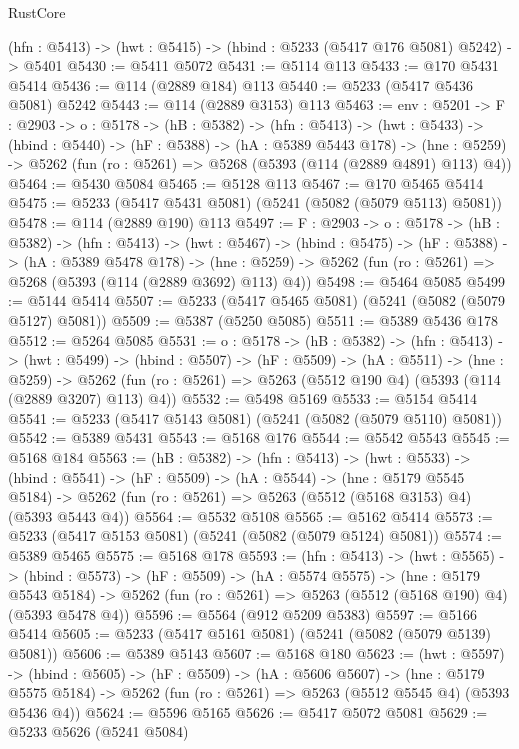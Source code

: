 \begin{lexlean}{RustCore}
\begin{coremodule}
  (hfn : @5413) -> (hwt : @5415) -> (hbind : @5233 (@5417 @176 @5081) @5242) -> @5401
@5430 := @5411 @5072
@5431 := @5114 @113
@5433 := @170 @5431 @5414
@5436 := @114 (@2889 @184) @113
@5440 := @5233 (@5417 @5436 @5081) @5242
@5443 := @114 (@2889 @3153) @113
@5463 := {env : @5201} ->
  {F : @2903} ->
  {o : @5178} ->
  (hB : @5382) ->
  (hfn : @5413) ->
  (hwt : @5433) ->
  (hbind : @5440) ->
  (hF : @5388) ->
  (hA : @5389 @5443 @178) ->
  (hne : @5259) -> @5262 (fun (ro : @5261) => @5268 (@5393 (@114 (@2889 @4891) @113) @4))
@5464 := @5430 @5084
@5465 := @5128 @113
@5467 := @170 @5465 @5414
@5475 := @5233 (@5417 @5431 @5081) (@5241 (@5082 (@5079 @5113) @5081))
@5478 := @114 (@2889 @190) @113
@5497 := {F : @2903} ->
  {o : @5178} ->
  (hB : @5382) ->
  (hfn : @5413) ->
  (hwt : @5467) ->
  (hbind : @5475) ->
  (hF : @5388) ->
  (hA : @5389 @5478 @178) ->
  (hne : @5259) -> @5262 (fun (ro : @5261) => @5268 (@5393 (@114 (@2889 @3692) @113) @4))
@5498 := @5464 @5085
@5499 := @5144 @5414
@5507 := @5233 (@5417 @5465 @5081) (@5241 (@5082 (@5079 @5127) @5081))
@5509 := @5387 (@5250 @5085)
@5511 := @5389 @5436 @178
@5512 := @5264 @5085
@5531 := {o : @5178} ->
  (hB : @5382) ->
  (hfn : @5413) ->
  (hwt : @5499) ->
  (hbind : @5507) ->
  (hF : @5509) ->
  (hA : @5511) ->
  (hne : @5259) ->
  @5262 (fun (ro : @5261) => @5263 (@5512 @190 @4) (@5393 (@114 (@2889 @3207) @113) @4))
@5532 := @5498 @5169
@5533 := @5154 @5414
@5541 := @5233 (@5417 @5143 @5081) (@5241 (@5082 (@5079 @5110) @5081))
@5542 := @5389 @5431
@5543 := @5168 @176
@5544 := @5542 @5543
@5545 := @5168 @184
@5563 := (hB : @5382) ->
  (hfn : @5413) ->
  (hwt : @5533) ->
  (hbind : @5541) ->
  (hF : @5509) ->
  (hA : @5544) ->
  (hne : @5179 @5545 @5184) ->
  @5262 (fun (ro : @5261) => @5263 (@5512 (@5168 @3153) @4) (@5393 @5443 @4))
@5564 := @5532 @5108
@5565 := @5162 @5414
@5573 := @5233 (@5417 @5153 @5081) (@5241 (@5082 (@5079 @5124) @5081))
@5574 := @5389 @5465
@5575 := @5168 @178
@5593 := (hfn : @5413) ->
  (hwt : @5565) ->
  (hbind : @5573) ->
  (hF : @5509) ->
  (hA : @5574 @5575) ->
  (hne : @5179 @5543 @5184) ->
  @5262 (fun (ro : @5261) => @5263 (@5512 (@5168 @190) @4) (@5393 @5478 @4))
@5596 := @5564 (@912 @5209 @5383)
@5597 := @5166 @5414
@5605 := @5233 (@5417 @5161 @5081) (@5241 (@5082 (@5079 @5139) @5081))
@5606 := @5389 @5143
@5607 := @5168 @180
@5623 := (hwt : @5597) ->
  (hbind : @5605) ->
  (hF : @5509) ->
  (hA : @5606 @5607) ->
  (hne : @5179 @5575 @5184) -> @5262 (fun (ro : @5261) => @5263 (@5512 @5545 @4) (@5393 @5436 @4))
@5624 := @5596 @5165
@5626 := @5417 @5072 @5081
@5629 := @5233 @5626 (@5241 @5084)

\end{coremodule}
\end{lexlean}
